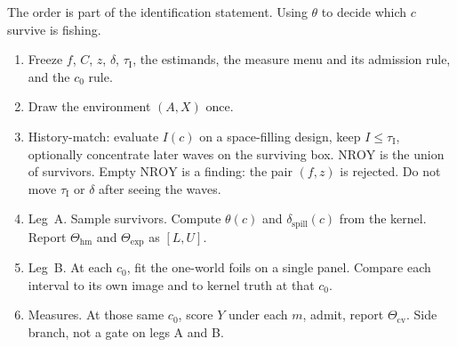 \documentclass[11pt]{article}
\newcommand{\NROY}{\mathrm{NROY}}
\newcommand{\hm}{\mathrm{hm}}
\newcommand{\cv}{\mathrm{cv}}
\newcommand{\expset}{\mathrm{exp}}
\newcommand{\thr}{\tau_{\mathrm{I}}}
\begin{document}
The order is part of the identification statement. Using $\theta$ to
decide which $c$ survive is fishing.

\begin{enumerate}
  \item Freeze $f$, $C$, $z$, $\delta$, $\thr$, the estimands, the
        measure menu and its admission rule, and the $c_0$ rule.
  \item Draw the environment $(A,X)$ once.
  \item History-match: evaluate $I(c)$ on a space-filling design,
        keep $I\le\thr$, optionally concentrate later waves on the
        surviving box. $\NROY$ is the union of survivors.
        Empty $\NROY$ is a finding: the pair $(f,z)$ is rejected.
        Do not move $\thr$ or $\delta$ after seeing the waves.
  \item Leg~A. Sample survivors. Compute $\theta(c)$ and
        $\delta_{\mathrm{spill}}(c)$ from the kernel. Report
        $\Theta_{\hm}$ and $\Theta_{\expset}$ as $[L,U]$.
  \item Leg~B. At each $c_0$, fit the one-world foils on a single
        panel. Compare each interval to its own image and to kernel
        truth at that $c_0$.
  \item Measures. At those same $c_0$, score $Y$ under each $m$,
        admit, report $\Theta_{\cv}$. Side branch, not a gate on
        legs A and B.
\end{enumerate}
\end{document}
